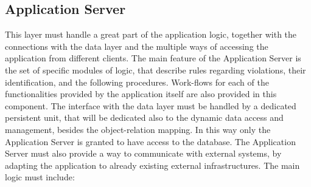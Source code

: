\subsection{Application Server}
This layer must handle a great part of the application logic, together with the connections with the data layer and the 
multiple ways of accessing the application from different clients. The main feature of the Application Server is the set 
of specific modules of logic, that describe rules regarding violations, their identification, and the following procedures. 
Work-flows for each of the functionalities provided by the application itself are also provided in this component. 
\newline The interface with the data layer must be handled by a dedicated persistent unit, that will be dedicated also to 
the dynamic data access and management, besides the object-relation mapping. In this way only the Application Server is 
granted to have access to the database.
\newline The Application Server must also provide a way to communicate with external systems, by adapting the application 
to already existing external infrastructures. 
\newline The main logic must include:

